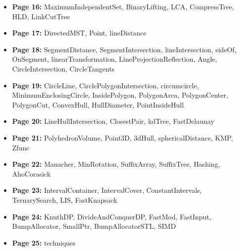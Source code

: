 \documentclass[9pt, a4paper, notitlepage]{extreport}
\begin{document}
\begin{multicols*}{3}
\begin{itemize}[noitemsep]
		\item \textbf{Page 16:} MaximumIndependentSet, BinaryLifting, LCA, CompressTree, HLD, LinkCutTree
		\item \textbf{Page 17:} DirectedMST, Point, lineDistance
		\item \textbf{Page 18:} SegmentDistance, SegmentIntersection, lineIntersection, sideOf, OnSegment, linearTransformation, LineProjectionReflection, Angle, CircleIntersection, CircleTangents
		\item \textbf{Page 19:} CircleLine, CirclePolygonIntersection, circumcircle, MinimumEnclosingCircle, InsidePolygon, PolygonArea, PolygonCenter, PolygonCut, ConvexHull, HullDiameter, PointInsideHull
		\item \textbf{Page 20:} LineHullIntersection, ClosestPair, kdTree, FastDelaunay
		\item \textbf{Page 21:} PolyhedronVolume, Point3D, 3dHull, sphericalDistance, KMP, Zfunc
		\item \textbf{Page 22:} Manacher, MinRotation, SuffixArray, SuffixTree, Hashing, AhoCorasick
		\item \textbf{Page 23:} IntervalContainer, IntervalCover, ConstantIntervals, TernarySearch, LIS, FastKnapsack
		\item \textbf{Page 24:} KnuthDP, DivideAndConquerDP, FastMod, FastInput, BumpAllocator, SmallPtr, BumpAllocatorSTL, SIMD
		\item \textbf{Page 25:} techniques
	\end{itemize}


	\end{multicols*}
\end{document}

